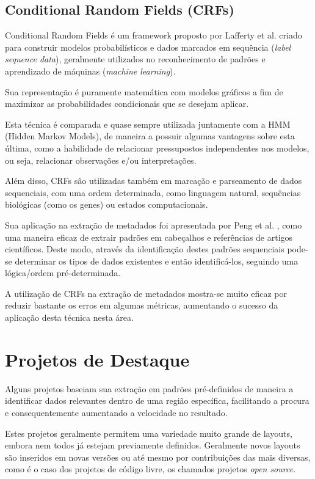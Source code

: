 \documentclass[
	12pt,               %
	openright,          %
	twoside,            %
	a4paper,            %
	english,            %
	brazil              %
	]{abntex2}
\begin{document}
\subsection{Conditional Random Fields (CRFs)}


Conditional Random Fields é um framework proposto por Lafferty et al. \cite{crf} criado para construir modelos probabilísticos e dados marcados em sequência (\textit{label sequence data}), geralmente utilizados no reconhecimento de padrões e aprendizado de máquinas (\textit{machine learning}).

Sua representação é puramente matemática com modelos gráficos a fim de maximizar as probabilidades condicionais que se desejam aplicar.

Esta técnica é comparada e quase sempre utilizada juntamente com a HMM (Hidden Markov Models), de maneira a possuir algumas vantagens sobre esta última, como a habilidade de relacionar pressupostos independentes nos modelos, ou seja, relacionar observações e/ou interpretações.

Além disso, CRFs são utilizadas também em marcação e parseamento de dados sequenciais, com uma ordem determinada, como linguagem natural, sequências biológicas (como os genes) ou estados computacionais.


Sua aplicação na extração de metadados foi apresentada por Peng et al. \cite{crf-ie}, como uma maneira eficaz de extrair padrões em cabeçalhos e referências de artigos científicos. Deste modo, através da identificação destes padrões sequenciais pode-se determinar os tipos de dados existentes e então identificá-los, seguindo uma lógica/ordem pré-determinada.

A utilização de CRFs na extração de metadados mostra-se muito eficaz por reduzir bastante os erros em algumas métricas, aumentando o sucesso da aplicação desta técnica nesta área.

\section{Projetos de Destaque}

Alguns projetos baseiam sua extração em padrões pré-definidos de maneira a identificar dados relevantes dentro de uma região específica, facilitando a procura e consequentemente aumentando a velocidade no resultado. 

Estes projetos geralmente permitem uma variedade muito grande de layouts, embora nem todos já estejam previamente definidos. Geralmente novos layouts são inseridos em novas versões ou até mesmo por contribuições das mais diversas, como é o caso dos projetos de código livre, os chamados projetos \textit{open source}.
\end{document}
